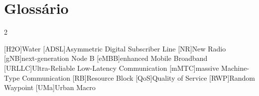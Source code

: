 \chapter{Glossário}

\footnotesize
\SingleSpacing

\begin{multicols}{2}
\begin{acronym}[AAAAAA]

	[H2O]{Water}
	[ADSL]{Asymmetric Digital Subscriber Line}
	[NR]{New Radio}
	[gNB]{next-generation Node B}
	[eMBB]{enhanced Mobile Broadband}
	[URLLC]{Ultra-Reliable Low-Latency Communication}
	[mMTC]{massive Machine-Type Communication}
	[RB]{Resource Block}
	[QoS]{Quality of Service}
	[RWP]{Random Waypoint}
	[UMa]{Urban Macro}

\end{acronym}
\end{multicols}

